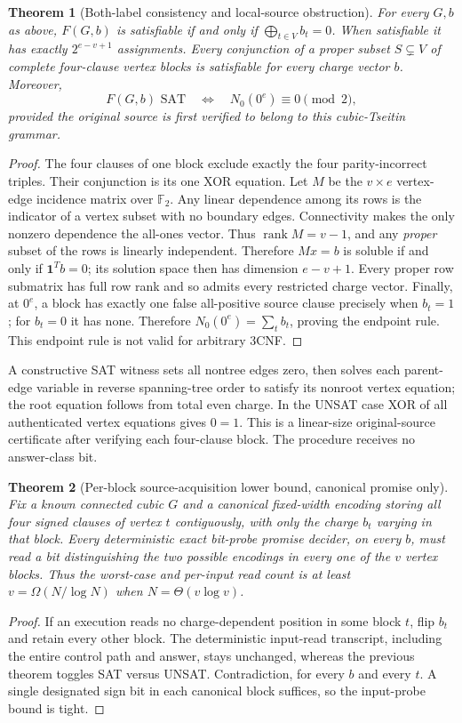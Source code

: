 \documentclass[11pt]{article}
\newtheorem{theorem}{Theorem}
\begin{document}
\begin{theorem}[Both-label consistency and local-source obstruction]
For every $G,b$ as above, $F(G,b)$ is satisfiable if and only if $\bigoplus_{t\in V}b_t=0$. When satisfiable it has exactly $2^{e-v+1}$ assignments. Every conjunction of a proper subset $S\subsetneq V$ of complete four-clause vertex blocks is satisfiable for \emph{every} charge vector $b$. Moreover,
\[
F(G,b)\text{ SAT}\quad\Longleftrightarrow\quad N_0(0^e)\equiv0\pmod2,
\]
provided the original source is first verified to belong to this cubic-Tseitin grammar.
\end{theorem}
\begin{proof}
The four clauses of one block exclude exactly the four parity-incorrect triples. Their conjunction is its one XOR equation. Let $M$ be the $v\times e$ vertex-edge incidence matrix over $\mathbb F_2$. Any linear dependence among its rows is the indicator of a vertex subset with no boundary edges. Connectivity makes the only nonzero dependence the all-ones vector. Thus $\operatorname{rank}M=v-1$, and any \emph{proper} subset of the rows is linearly independent. Therefore $Mx=b$ is soluble if and only if $\mathbf1^Tb=0$; its solution space then has dimension $e-v+1$. Every proper row submatrix has full row rank and so admits every restricted charge vector. Finally, at $0^e$, a block has exactly one false all-positive source clause precisely when $b_t=1$; for $b_t=0$ it has none. Therefore $N_0(0^e)=\sum_t b_t$, proving the endpoint rule. This endpoint rule is not valid for arbitrary 3CNF.
\end{proof}
A constructive SAT witness sets all nontree edges zero, then solves each parent-edge variable in reverse spanning-tree order to satisfy its nonroot vertex equation; the root equation follows from total even charge. In the UNSAT case XOR of all authenticated vertex equations gives $0=1$. This is a linear-size original-source certificate after verifying each four-clause block. The procedure receives no answer-class bit.

\begin{theorem}[Per-block source-acquisition lower bound, canonical promise only]
Fix a known connected cubic $G$ and a canonical fixed-width encoding storing all four signed clauses of vertex $t$ contiguously, with only the charge $b_t$ varying in that block. Every deterministic exact bit-probe promise decider, on \emph{every} $b$, must read a bit distinguishing the two possible encodings in \emph{every} one of the $v$ vertex blocks. Thus the worst-case and per-input read count is at least $v=\Omega(N/\log N)$ when $N=\Theta(v\log v)$.
\end{theorem}
\begin{proof}
If an execution reads no charge-dependent position in some block $t$, flip $b_t$ and retain every other block. The deterministic input-read transcript, including the entire control path and answer, stays unchanged, whereas the previous theorem toggles SAT versus UNSAT. Contradiction, for every $b$ and every $t$. A single designated sign bit in each canonical block suffices, so the input-probe bound is tight.
\end{proof}
\end{document}

